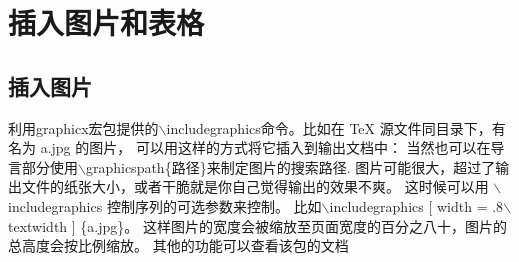 \section{插入图片和表格}
\subsection{插入图片}
利用graphicx宏包提供的$\backslash$includegraphics命令。比如在 TeX 源文件同目录下，有名为 a.jpg 的图片，
可以用这样的方式将它插入到输出文档中：
当然也可以在导言部分使用$\backslash$graphicspath\{路径\}来制定图片的搜索路径.
图片可能很大，超过了输出文件的纸张大小，或者干脆就是你自己觉得输出的效果不爽。
这时候可以用 $\backslash$includegraphics 控制序列的可选参数来控制。
比如$\backslash$includegraphics [ width = .8$\backslash$ textwidth ] \{a.jpg\}。
这样图片的宽度会被缩放至页面宽度的百分之八十，图片的总高度会按比例缩放。
其他的功能可以查看该包的文档\\
